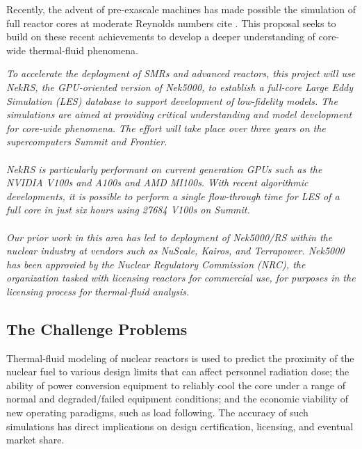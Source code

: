 Recently, the advent of pre-exascale machines has made possible the simulation
of full reactor cores at moderate Reynolds numbers cite \cite{Fang2021}.  This
proposal seeks to build on these recent achievements to develop a deeper
understanding of core-wide thermal-fluid phenomena.

\begin{displayquote}
{\it
To accelerate the deployment of SMRs and advanced reactors, this project will
use NekRS, the GPU-oriented version of Nek5000, to establish a full-core Large Eddy
Simulation (LES) database to support development of low-fidelity models.  
The simulations are aimed at providing critical understanding and model
development for core-wide phenomena.  The effort will take place over three
years on the supercomputers Summit and Frontier.\\
\\
\noindent NekRS is particularly performant on current generation GPUs such as the NVIDIA
V100s and A100s and AMD MI100s.  With recent algorithmic developments, it is possible 
to perform a single flow-through time for LES of a full core in just six hours 
using 27684 V100s on Summit.\\
\\
Our prior work in this area has led to deployment of Nek5000/RS within the 
nuclear industry at vendors such as NuScale, Kairos, and Terrapower.
Nek5000 has been approvied by the Nuclear Regulatory Commission (NRC), the
organization tasked with licensing reactors for commercial use,
for purposes in the licensing process for thermal-fluid analysis.
}
\end{displayquote}

\vspace{-.25in} \subsection{The Challenge Problems}
\vspace{-.2in}

Thermal-fluid modeling of nuclear reactors is used to predict the
proximity of the nuclear fuel to various design limits that can affect
personnel radiation dose; the ability of power conversion equipment to reliably
cool the core under a range of normal and degraded/failed equipment conditions;
and the economic viability of new operating paradigms, such as load following.
The accuracy of such simulations has direct implications on design
certification, licensing, and eventual market share. 

